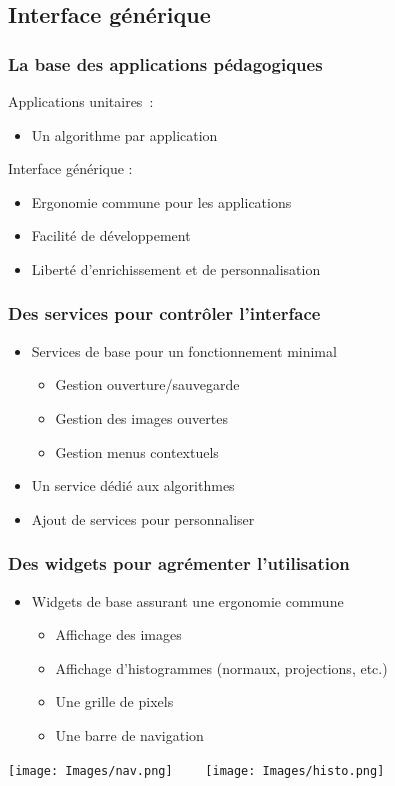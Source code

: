 \subsection{Interface générique}

\begin{frame}
	\frametitle{La base des applications pédagogiques}
	Applications unitaires~:
	\begin{itemize}
		\item Un algorithme par application
	\end{itemize}

\vspace{0.6cm}

	Interface générique :
	\begin{itemize}
		\item Ergonomie commune pour les applications
		\item Facilité de développement
		\item Liberté d'enrichissement et de personnalisation
	\end{itemize}
\end{frame}

\begin{frame}
	\frametitle{Des services pour contrôler l'interface}
	\begin{itemize}
		\item Services de base pour un fonctionnement minimal
			\begin{itemize}
				\item Gestion ouverture/sauvegarde
				\item Gestion des images ouvertes
				\item Gestion menus contextuels
			\end{itemize}
		\item Un service dédié aux algorithmes
		\item Ajout de services pour personnaliser
	\end{itemize}
\end{frame}

\begin{frame}
	\frametitle{Des widgets pour agrémenter l'utilisation}
	\begin{itemize}
		\item Widgets de base assurant une ergonomie commune
			\begin{itemize}
				\item Affichage des images
				\item Affichage d'histogrammes (normaux, projections, etc.)
				\item Une grille de pixels
				\item Une barre de navigation 
			\end{itemize}
	\end{itemize}
	\begin{center}
		\texttt{[image: Images/nav.png]}~~~~
		\texttt{[image: Images/histo.png]}
	\end{center}


\end{frame}

